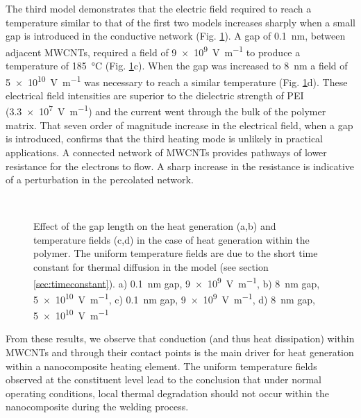 The third model demonstrates that the electric field required to reach a temperature similar to that of the first two models increases sharply when a small gap is introduced in the conductive network (Fig. \ref{fig:result_gap}). 
A gap of \SI{0.1}{\nano\metre}, between adjacent MWCNTs, required a field of \SI{9e9}{\volt\per\metre} to produce a temperature of \SI{185}{\celsius} (Fig. \ref{fig:result_gap}c). 
When the gap was increased to \SI{8}{\nano\metre} a field of \SI{5e10}{\volt\per\metre} was necessary to reach a similar temperature (Fig. \ref{fig:result_gap}d). 
These electrical field intensities are superior to the dielectric strength of PEI (\SI{3.3e7}{\volt\per\metre}) and the current went through the bulk of the polymer matrix. 
That seven order of magnitude increase in the electrical field, when a gap is introduced, confirms that the third heating mode is unlikely in practical applications. 
A connected network of MWCNTs provides pathways of lower resistance for the electrons to flow. 
A sharp increase in the resistance is indicative of a perturbation in the percolated network. 

\begin{figure}[h!]
	\centering
	 \\
	\caption{Effect of the gap length on the heat generation (a,b) and temperature fields (c,d) in the case of heat generation within the polymer. The uniform temperature fields are due to the short time constant for thermal diffusion in the model (see section \ref{sec:timeconstant}).  a) \SI{0.1}{\nano\metre} gap, \SI{9e9}{\volt\per\metre}, b) \SI{8}{\nano\metre} gap, \SI{5e10}{\volt\per\metre}, c) \SI{0.1}{\nano\metre} gap, \SI{9e9}{\volt\per\metre}, d) \SI{8}{\nano\metre} gap, \SI{5e10}{\volt\per\metre} \cite{Brassard2018_figshare_article1}}
	\label{fig:result_gap}
\end{figure}

From these results, we observe that conduction (and thus heat dissipation) within MWCNTs and through their contact points is the main driver for heat generation within a nanocomposite heating element. 
The uniform temperature fields observed at the constituent level lead to the conclusion that under normal operating conditions, local thermal degradation should not occur within the nanocomposite during the welding process. 

